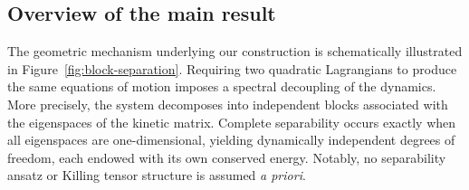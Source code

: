 \documentclass{rendiconti}
\begin{document}

\subsection{Overview of the main result}

The geometric mechanism underlying our construction is schematically illustrated in Figure~\ref{fig:block-separation}. Requiring two quadratic Lagrangians to produce the same equations of motion imposes a spectral decoupling of the dynamics. More precisely, the system decomposes into independent blocks associated with the eigenspaces of the kinetic matrix. Complete separability occurs exactly when all eigenspaces are one-dimensional, yielding dynamically independent degrees of freedom, each endowed with its own conserved energy. Notably, no separability ansatz or Killing tensor structure is assumed \emph{a priori}.
\end{document}
